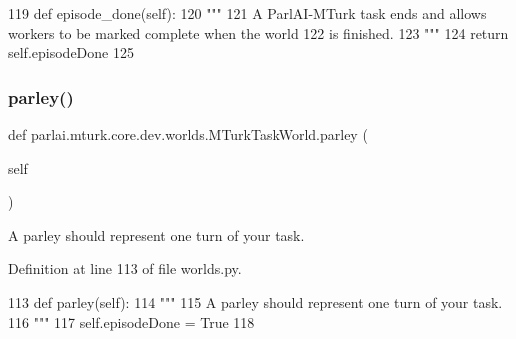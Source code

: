 \begin{DoxyCode}
119     \textcolor{keyword}{def }episode\_done(self):
120         \textcolor{stringliteral}{"""}
121 \textcolor{stringliteral}{        A ParlAI-MTurk task ends and allows workers to be marked complete when the world}
122 \textcolor{stringliteral}{        is finished.}
123 \textcolor{stringliteral}{        """}
124         \textcolor{keywordflow}{return} self.episodeDone
125 
\end{DoxyCode}
\mbox{\label{classparlai_1_1mturk_1_1core_1_1dev_1_1worlds_1_1MTurkTaskWorld_af26e4a1fe60215bdfb24d66c52d6aa8e}} 
\subsubsection{\texorpdfstring{parley()}{parley()}}
{\footnotesize\ttfamily def parlai.\+mturk.\+core.\+dev.\+worlds.\+M\+Turk\+Task\+World.\+parley (\begin{DoxyParamCaption}\item[{}]{self }\end{DoxyParamCaption})}

\begin{DoxyVerb}A parley should represent one turn of your task.
\end{DoxyVerb}
 

Definition at line 113 of file worlds.\+py.


\begin{DoxyCode}
113     \textcolor{keyword}{def }parley(self):
114         \textcolor{stringliteral}{"""}
115 \textcolor{stringliteral}{        A parley should represent one turn of your task.}
116 \textcolor{stringliteral}{        """}
117         self.episodeDone = \textcolor{keyword}{True}
118 
\end{DoxyCode}
\mbox{\label{classparlai_1_1mturk_1_1core_1_1dev_1_1worlds_1_1MTurkTaskWorld_a9128507c0a4ae977faf779690462ab37}} 
